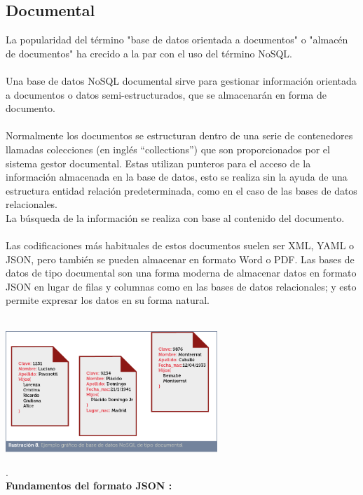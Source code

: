 \documentclass[%
 reprint,
 amsmath,amssymb,
 aps,
]{revtex4-1}
\begin{document}
\subsection{Documental}
 La popularidad del término "base de datos orientada a documentos" o "almacén de documentos" ha crecido a la par con el uso del término NoSQL.\\
\\ Una base de datos NoSQL documental sirve para gestionar información orientada a documentos o datos semi-estructurados, que se almacenarán en forma de documento.
\\\\Normalmente los documentos se estructuran dentro de una serie de contenedores llamadas colecciones (en inglés “collections”) que son proporcionados por el sistema gestor documental. Estas utilizan punteros para el acceso de la información almacenada en la base de datos, esto se realiza sin la ayuda de una estructura entidad relación predeterminada, como en el caso de las bases de datos relacionales.\\
La búsqueda de la información se realiza con base al contenido del documento. \\\\
Las codificaciones más habituales de estos documentos suelen ser XML, YAML o JSON, pero también se pueden almacenar en formato Word o PDF. Las bases de datos de tipo documental son una forma moderna de almacenar datos en formato JSON en lugar de filas y columnas como en las bases de datos relacionales; y esto permite expresar los datos en su forma natural. \\\\
\begin{center}
	\includegraphics[width=8cm]{./Imagenes/documental1}
\end{center}	
.\\
\textbf{Fundamentos del formato JSON :}
\end{document}
